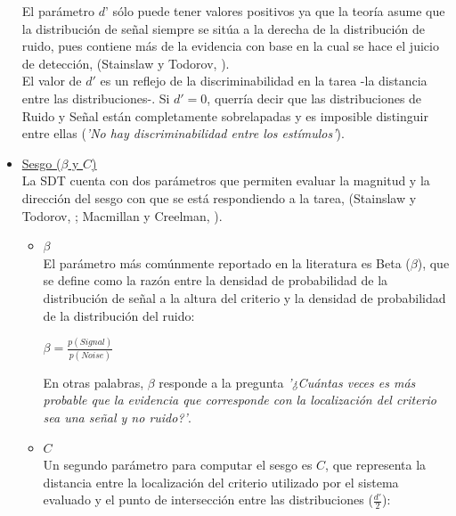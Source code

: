 \begin{itemize}
\begin{enumerate}
\end{enumerate}

El parámetro $d’$ sólo puede tener valores positivos ya que la teoría asume que la distribución de señal siempre se sitúa a la derecha de la distribución de ruido, pues contiene más de la evidencia con base en la cual se hace el juicio de detección, (Stainslaw y Todorov, \citeyear{Stainslaw1999}).\\

El valor de $d'$ es un reflejo de la discriminabilidad en la tarea -la distancia entre las distribuciones-. Si $d' = 0$, querría decir que las distribuciones de Ruido y Señal están completamente sobrelapadas y es imposible distinguir entre ellas (\textit{'No hay discriminabilidad entre los estímulos'}). \\

\item \underline{Sesgo ($\beta$ y $C$)}\\

La SDT cuenta con dos parámetros que permiten evaluar la magnitud y la dirección del sesgo con que se está respondiendo a la tarea, (Stainslaw y Todorov, \citep{Stainslaw1999}; Macmillan y Creelman, \citeyear{Macmillan1996}).\\

\begin{itemize}
\item \underline{$\beta$}\\

El parámetro más comúnmente reportado en la literatura es Beta ($\beta$), que se define como la razón entre la densidad de probabilidad de la distribución de señal a la altura del criterio y la densidad de probabilidad  de la distribución del ruido: \\

\begin{center}
$\beta = \frac{p(Signal)}{p(Noise)}$ \\
\end{center}

En otras palabras, $\beta$ responde a la pregunta \textit{'¿Cuántas veces es más probable que la evidencia que corresponde con la localización del criterio sea una señal y no ruido?'}.

\item \underline{$C$}\\

Un segundo parámetro para computar el sesgo es $C$, que representa la distancia entre la localización del criterio utilizado por el sistema evaluado y el punto de intersección entre las distribuciones ($\frac{d'}{2}$):\\


\end{itemize}
\end{itemize}
